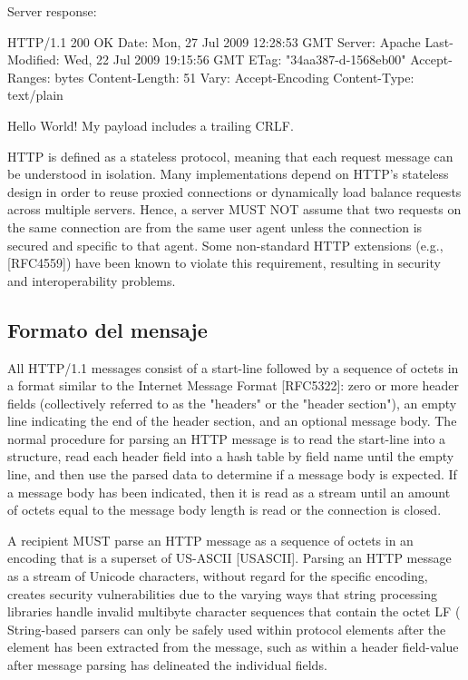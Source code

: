 Server response:

  HTTP/1.1 200 OK
  Date: Mon, 27 Jul 2009 12:28:53 GMT
  Server: Apache
  Last-Modified: Wed, 22 Jul 2009 19:15:56 GMT
  ETag: "34aa387-d-1568eb00"
  Accept-Ranges: bytes
  Content-Length: 51
  Vary: Accept-Encoding
  Content-Type: text/plain

  Hello World! My payload includes a trailing CRLF.

  HTTP is defined as a stateless protocol, meaning that each request
   message can be understood in isolation.  Many implementations depend
   on HTTP's stateless design in order to reuse proxied connections or
   dynamically load balance requests across multiple servers.  Hence, a
   server MUST NOT assume that two requests on the same connection are
   from the same user agent unless the connection is secured and
   specific to that agent.  Some non-standard HTTP extensions (e.g.,
   [RFC4559]) have been known to violate this requirement, resulting in
   security and interoperability problems.
\subsection{Formato del mensaje}
All HTTP/1.1 messages consist of a start-line followed by a sequence
of octets in a format similar to the Internet Message Format
[RFC5322]: zero or more header fields (collectively referred to as
the "headers" or the "header section"), an empty line indicating the
end of the header section, and an optional message body.
The normal procedure for parsing an HTTP message is to read the
   start-line into a structure, read each header field into a hash table
   by field name until the empty line, and then use the parsed data to
   determine if a message body is expected.  If a message body has been
   indicated, then it is read as a stream until an amount of octets
   equal to the message body length is read or the connection is closed.

   A recipient MUST parse an HTTP message as a sequence of octets in an
   encoding that is a superset of US-ASCII [USASCII].  Parsing an HTTP
   message as a stream of Unicode characters, without regard for the
   specific encoding, creates security vulnerabilities due to the
   varying ways that string processing libraries handle invalid
   multibyte character sequences that contain the octet LF (%
   String-based parsers can only be safely used within protocol elements
   after the element has been extracted from the message, such as within
   a header field-value after message parsing has delineated the
   individual fields.

